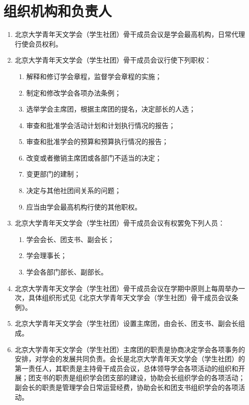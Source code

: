 \section{组织机构和负责人}


\begin{enumerate}[resume]
    \item 北京大学青年天文学会（学生社团）骨干成员会议是学会最高机构，日常代理行使会员权利。
    
    \item 北京大学青年天文学会（学生社团）骨干成员会议行使下列职权：
    
    \begin{enumerate}
        \item 解释和修订学会章程，监督学会章程的实施；
        \item 制定和修改学会各项办法条例；
        \item 选举学会主席团，根据主席团的提名，决定部长的人选；
        \item 审查和批准学会活动计划和计划执行情况的报告；
        \item 审查和批准学会的预算和预算执行情况的报告；
        \item 改变或者撤销主席团或各部门不适当的决定；
        \item 变更部门的建制；
        \item 决定与其他社团间关系的问题；
        \item 应当由学会最高机构行使的其他职权。
    \end{enumerate}
    
    \item 北京大学青年天文学会（学生社团）骨干成员会议有权罢免下列人员：
    
    \begin{enumerate}
        \item 学会会长、团支书、副会长；
        \item 学会理事长；
        \item 学会各部门部长、副部长。
    \end{enumerate}
    
    \item 北京大学青年天文学会（学生社团）骨干成员会议在学期中原则上每周举办一次，具体组织形式见《北京大学青年天文学会（学生社团）骨干成员会议条例》。
    
    \item 北京大学青年天文学会（学生社团）设置主席团，由会长、团支书、副会长组成。
    
    \item 北京大学青年天文学会（学生社团）主席团的职责是协商决定学会各项事务的安排，对学会的发展共同负责。会长是北京大学青年天文学会（学生社团）的第一责任人，其职责是主持骨干成员会议，总体领导学会各项活动的组织和开展；团支书的职责是组织学会团支部的建设，协助会长组织学会的各项活动；副会长的职责是管理学会日常运营经费，协助会长和团支书组织学会的各项活动。
    

\end{enumerate}
